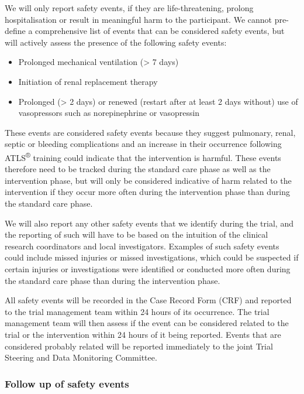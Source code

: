 \documentclass[
]{scrartcl}
\providecommand{\tightlist}{%
  \setlength{\itemsep}{0pt}\setlength{\parskip}{0pt}}\usepackage{longtable,booktabs,array}
\begin{document}
We will only report safety events, if they are life-threatening, prolong
hospitalisation or result in meaningful harm to the participant. We
cannot pre-define a comprehensive list of events that can be considered
safety events, but will actively assess the presence of the following
safety events:

\begin{itemize}
\tightlist
\item
  Prolonged mechanical ventilation (\textgreater{} 7 days)
\item
  Initiation of renal replacement therapy
\item
  Prolonged (\textgreater{} 2 days) or renewed (restart after at least 2
  days without) use of vasopressors such as norepinephrine or
  vasopressin
\end{itemize}

These events are considered safety events because they suggest
pulmonary, renal, septic or bleeding complications and an increase in
their occurrence following ATLS\textsuperscript{®} training could
indicate that the intervention is harmful. These events therefore need
to be tracked during the standard care phase as well as the intervention
phase, but will only be considered indicative of harm related to the
intervention if they occur more often during the intervention phase than
during the standard care phase.

We will also report any other safety events that we identify during the
trial, and the reporting of such will have to be based on the intuition
of the clinical research coordinators and local investigators. Examples
of such safety events could include missed injuries or missed
investigations, which could be suspected if certain injuries or
investigations were identified or conducted more often during the
standard care phase than during the intervention phase.

All safety events will be recorded in the Case Record Form (CRF) and
reported to the trial management team within 24 hours of its occurrence.
The trial management team will then assess if the event can be
considered related to the trial or the intervention within 24 hours of
it being reported. Events that are considered probably related will be
reported immediately to the joint Trial Steering and Data Monitoring
Committee.

\hypertarget{follow-up-of-safety-events}{%
\subsubsection{Follow up of safety
events}\label{follow-up-of-safety-events}}
\end{document}
